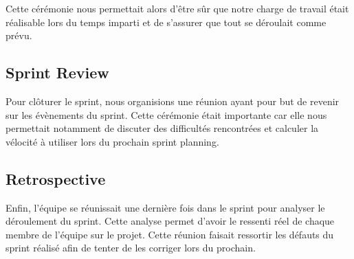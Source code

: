 \documentclass[11pt]{report}
\begin{document}
Cette cérémonie nous permettait alors d'être sûr que notre charge de travail était réalisable lors du temps imparti
et de s'assurer que tout se déroulait comme prévu.

\subsection{Sprint Review}

Pour clôturer le sprint, nous organisions une réunion ayant pour but de revenir sur les évènements du sprint.
Cette cérémonie était importante car elle nous permettait notamment de discuter des difficultés rencontrées et calculer la vélocité 
à utiliser lors du prochain sprint planning.

\subsection{Retrospective}

Enfin, l'équipe se réunissait une dernière fois dans le sprint pour analyser le déroulement du sprint. Cette analyse permet d'avoir le ressenti réel de chaque membre de l'équipe sur le projet. Cette réunion faisait ressortir les défauts du sprint réalisé afin de tenter de les corriger lors du prochain.
\end{document}

